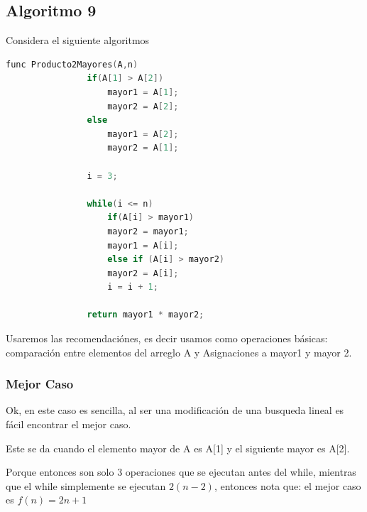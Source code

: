 \documentclass[12pt, fleqn]{article}                            %
\theoremstyle{break}                                            %
\begin{document}
    \clearpage
    \subsection{Algoritmo 9}

        Considera el siguiente algoritmos
        \begin{lstlisting}[language=C, gobble=12, basicstyle=\small\color{white}]
            func Producto2Mayores(A,n)
                if(A[1] > A[2])
                    mayor1 = A[1];
                    mayor2 = A[2];
                else
                    mayor1 = A[2];
                    mayor2 = A[1];
                
                i = 3;

                while(i <= n)
                    if(A[i] > mayor1)
                    mayor2 = mayor1;
                    mayor1 = A[i];
                    else if (A[i] > mayor2)
                    mayor2 = A[i];
                    i = i + 1;

                return mayor1 * mayor2;
        \end{lstlisting}

        Usaremos las recomendaciónes, es decir
        usamos como operaciones básicas:
        comparación entre elementos del arreglo A y
        Asignaciones a mayor1 y mayor 2.


        \vspace{1em}
        \subsubsection{Mejor Caso}

            Ok, en este caso es sencilla, al ser una modificación de una busqueda lineal
            es fácil encontrar el mejor caso.

            Este se da cuando el elemento mayor de A es A[1] y el siguiente mayor es A[2].

            Porque entonces son solo 3 operaciones que se ejecutan antes del while, mientras
            que el while simplemente se ejecutan $2(n-2)$, entonces nota que:
            el mejor caso es $f(n) = 2n + 1$
\end{document}
